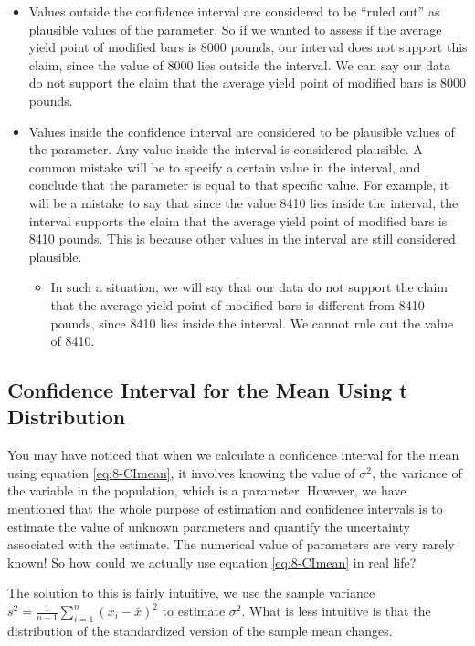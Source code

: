 \documentclass[
]{book}
\providecommand{\tightlist}{%
  \setlength{\itemsep}{0pt}\setlength{\parskip}{0pt}}
\begin{document}
\begin{itemize}
\item
  Values outside the confidence interval are considered to be ``ruled out'' as plausible values of the parameter. So if we wanted to assess if the average yield point of modified bars is 8000 pounds, our interval does not support this claim, since the value of 8000 lies outside the interval. We can say our data do not support the claim that the average yield point of modified bars is 8000 pounds.
\item
  Values inside the confidence interval are considered to be plausible values of the parameter. Any value inside the interval is considered plausible. A common mistake will be to specify a certain value in the interval, and conclude that the parameter is equal to that specific value. For example, it will be a mistake to say that since the value 8410 lies inside the interval, the interval supports the claim that the average yield point of modified bars is 8410 pounds. This is because other values in the interval are still considered plausible.

  \begin{itemize}
  \tightlist
  \item
    In such a situation, we will say that our data do not support the claim that the average yield point of modified bars is different from 8410 pounds, since 8410 lies inside the interval. We cannot rule out the value of 8410.
  \end{itemize}
\end{itemize}

\subsection{Confidence Interval for the Mean Using t Distribution}\label{confidence-interval-for-the-mean-using-t-distribution}

You may have noticed that when we calculate a confidence interval for the mean using equation \eqref{eq:8-CImean}, it involves knowing the value of \(\sigma^2\), the variance of the variable in the population, which is a parameter. However, we have mentioned that the whole purpose of estimation and confidence intervals is to estimate the value of unknown parameters and quantify the uncertainty associated with the estimate. The numerical value of parameters are very rarely known! So how could we actually use equation \eqref{eq:8-CImean} in real life?

The solution to this is fairly intuitive, we use the sample variance \(s^2 = \frac{1}{n-1} \sum_{i=1}^n (x_i - \bar{x})^2\) to estimate \(\sigma^2\). What is less intuitive is that the distribution of the standardized version of the sample mean changes.
\end{document}
